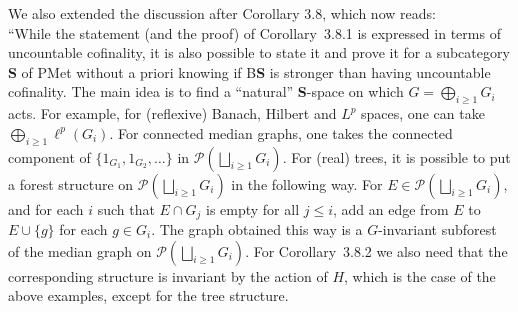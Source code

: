 \documentclass[english,a4paper]{article}
\newcommand*{\BS}{B\textbf{S}}
\begin{document}
\begin{enumerate}
We also extended the discussion after Corollary 3.8, which now reads:\\
``While the statement (and the proof) of Corollary~3.8.1 is expressed in terms of uncountable cofinality, it is also possible to state it and prove it for a subcategory \textbf{S} of PMet without a priori knowing if \BS{} is stronger than having uncountable cofinality.
The main idea is to find a ``natural'' \textbf{S}-space on which $G=\bigoplus_{i\geq 1}G_i$ acts. For example, for (reflexive) Banach, Hilbert and $L^p$ spaces, one can take $\bigoplus_{i\geq 1}\ell^p(G_i)$. For connected median graphs, one takes the connected component of $\{1_{G_1},1_{G_2},\dots\}$ in $\mathcal P(\bigsqcup_{i\geq 1} G_i)$.
For (real) trees, it is possible to put a forest structure on $\mathcal P(\bigsqcup_{i\geq 1} G_i)$ in the following way.
For $E\in\mathcal P(\bigsqcup_{i\geq 1} G_i)$, and for each $i$ such that $E\cap G_j$ is empty for all $j\leq i$, add an edge from $E$ to $E\cup\{g\}$ for each $g\in G_i$. The graph obtained this way is a $G$-invariant subforest of the median graph on $\mathcal P(\bigsqcup_{i\geq 1} G_i)$.
For Corollary~3.8.2 we also need that the corresponding structure is invariant by the action of $H$, which is the case of the above examples, except for the tree structure.


\end{enumerate}
\end{document}
